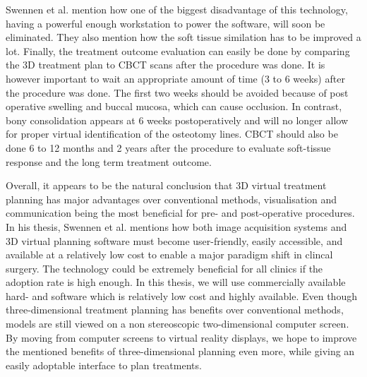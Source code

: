 Swennen et al. mention how one of the biggest disadvantage of this technology, having a powerful enough workstation to power the software, will soon be eliminated.
They also mention how the soft tissue similation has to be improved a lot.
Finally, the treatment outcome evaluation can easily be done by comparing the 3D treatment plan to CBCT scans after the procedure was done.
It is however important to wait an appropriate amount of time (3 to 6 weeks) after the procedure was done.
The first two weeks should be avoided because of post operative swelling and buccal mucosa, which can cause occlusion.
In contrast, bony consolidation appears at 6 weeks postoperatively and will no longer allow for proper virtual identification of the osteotomy lines.
CBCT should also be done 6 to 12 months and 2 years after the procedure to evaluate soft-tissue response and the long term treatment outcome.

Overall, it appears to be the natural conclusion that 3D virtual treatment planning has major advantages over conventional methods, visualisation and communication being the most beneficial for pre- and post-operative procedures.
In his thesis, Swennen et al. mentions how both image acquisition systems and 3D virtual planning software must become user-friendly, easily accessible, and available at a relatively low cost \cite{swennen2009three} to enable a major paradigm shift in clincal surgery.
The technology could be extremely beneficial for all clinics if the adoption rate is high enough.
In this thesis, we will use commercially available hard- and software which is relatively low cost and highly available.
Even though three-dimensional treatment planning has benefits over conventional methods, models are still viewed on a non stereoscopic two-dimensional computer screen.
By moving from computer screens to virtual reality displays, we hope to improve the mentioned benefits of three-dimensional planning even more, while giving an easily adoptable interface to plan treatments.

